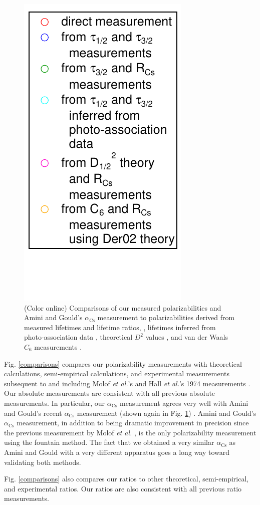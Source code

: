 \documentclass[twocolumn,prl,showpacs,superscriptaddress]{revtex4-1}   %
\newcommand{\figref}[1]{Fig. \ref{#1}}
\newcommand{\acs}{\alpha_{\textrm{Cs}}}
\newcommand{\etal}{\textit{et al.}}
\newcommand{\etalspace}{\textit{et al. }}
\begin{document}
\begin{figure}
\includegraphics[width=0.365\linewidth,keepaspectratio,valign=t]{displayMiscLegend.pdf}
\caption{\label{comparisonsMisc}(Color online) Comparisons of our measured polarizabilities and Amini and Gould's $\acs$ measurement \cite{Amini2003} to polarizabilities derived from measured lifetimes and lifetime ratios,
\cite{Young1994,Rafac1999,Bouloufa2007,Falke2006a,Volz2006,Simsarian1998,Wang1997,Rafac1998}, 
lifetimes inferred from photo-association data
\cite{Gabbanini2000,Gutterres2002},
theoretical $D^2$ values
\cite{Porsev2010},
and van der Waals $C_6$ measurements
\cite{Leo2000,Chin2004,Derevianko2001}.}
\end{figure}

\figref{comparisons} compares our polarizability measurements with theoretical calculations, semi-empirical calculations, and experimental measurements subsequent to and including Molof \etal's and Hall \etal's 1974 measurements \cite{Molof1974,Hall1974}. Our absolute measurements are consistent with all previous absolute measurements. 
In particular, our $\acs$ measurement agrees very well with Amini and Gould's recent $\acs$ measurement (shown again in \figref{comparisonsMisc}) \cite{Amini2003}. Amini and Gould's $\acs$ measurement, in addition to being dramatic improvement in precision since the previous measurement by Molof \etalspace \cite{Molof1974}, is the only polarizability measurement using the fountain method. The fact that we obtained a very similar $\acs$ as Amini and Gould with a very different apparatus goes a long way toward validating both methods.

\figref{comparisons} also compares our ratios to other theoretical, semi-empirical, and experimental ratios. Our ratios are also consistent with all previous ratio measurements.
\end{document}
